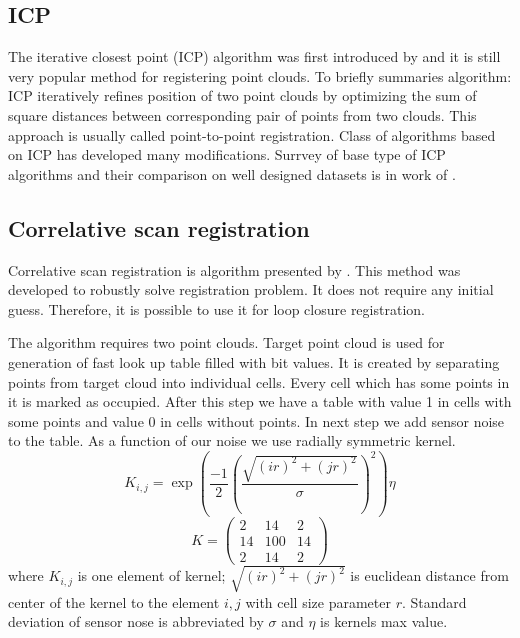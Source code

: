 \newpage
\subsection {ICP}
\label{subsec:ICP}
The iterative closest point (\gls{ICP}) algorithm was first introduced by \cite{chen92ICP} and it is still very popular method for registering point clouds. To briefly summaries algorithm: ICP iteratively refines position of two point clouds by optimizing the sum of square distances between corresponding pair of points from two clouds. This approach is usually called point-to-point registration. Class of algorithms based on \gls{ICP} has developed many modifications. Surrvey of base type of ICP algorithms and their comparison on well designed datasets is in work of \cite{pomerleau2013comparing}. 



\subsection{Correlative scan registration}
\label{subsec:Corr}
Correlative scan registration is algorithm presented by \cite{olson2009real}. This method was developed to robustly solve registration problem. It does not require any initial guess. Therefore, it is possible to use it for loop closure registration.

 The algorithm requires two point clouds. Target point cloud is used for generation of fast look up table filled with bit values. It is created by separating points from target cloud into individual cells. Every cell which has some points in it is marked as occupied. After this step we have a table with value 1 in cells with some points and value 0 in cells without points. In next step we add sensor noise to the table. As a function of our noise we use radially symmetric kernel. 
 \begin{equation}
 \label{eq:smooth_kernel}
 K_{i,j} = \exp\left(\frac{-1}{2}\left(\frac{\sqrt{(i r)^{2} + (j r)^{2}}}{\sigma}\right)^{2}\right) \eta
 \end{equation}
 \begin{equation}
 K =
 \begin{pmatrix}
  2 & 14 & 2\\
  14 & 100 & 14 \\
  2 & 14 & 2 
 \end{pmatrix}
 \end{equation}
 where $K_{i,j}$ is one element of kernel; $\sqrt{(i r)^{2} + (j r)^{2}}$ is euclidean distance from center of the kernel to the element $i,j$ with cell size parameter $r$. Standard deviation of sensor nose is abbreviated by $\sigma$ and $\eta$ is kernels max value.


